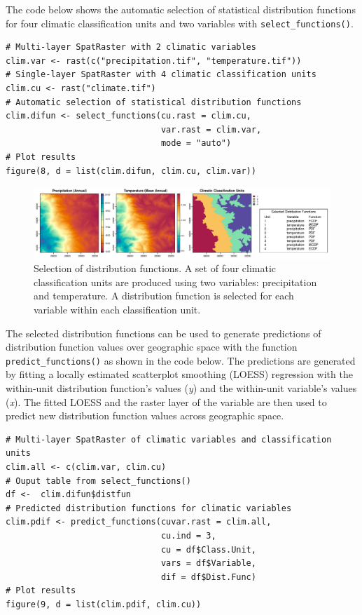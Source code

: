 The code below shows the automatic selection of statistical distribution
functions for four climatic classification units and two variables with
\texttt{select\_functions()}.

\begin{verbatim}
# Multi-layer SpatRaster with 2 climatic variables
clim.var <- rast(c("precipitation.tif", "temperature.tif"))
# Single-layer SpatRaster with 4 climatic classification units
clim.cu <- rast("climate.tif")
# Automatic selection of statistical distribution functions
clim.difun <- select_functions(cu.rast = clim.cu,
                               var.rast = clim.var,
                               mode = "auto")
# Plot results
figure(8, d = list(clim.difun, clim.cu, clim.var))
\end{verbatim}

\begin{figure}[H]

{\centering \includegraphics[width=1\linewidth,height=0.13\textheight]{figures/figure_8} 

}

\caption{Selection of distribution functions. A set of four climatic classification units are produced using two variables: precipitation and temperature. A distribution function is selected for each variable within each classification unit.}\label{fig:f9}
\end{figure}

The selected distribution functions can be used to generate predictions of
distribution function values over geographic space with the function
\texttt{predict\_functions()} as shown in the code below. The predictions are generated
by fitting a locally estimated scatterplot smoothing (LOESS) regression with the
within-unit distribution function's values (\emph{y}) and the within-unit variable's
values (\emph{x}). The fitted LOESS and the raster layer of the variable are then
used to predict new distribution function values across geographic space.

\begin{verbatim}
# Multi-layer SpatRaster of climatic variables and classification units
clim.all <- c(clim.var, clim.cu)
# Ouput table from select_functions()
df <-  clim.difun$distfun
# Predicted distribution functions for climatic variables
clim.pdif <- predict_functions(cuvar.rast = clim.all,
                               cu.ind = 3,
                               cu = df$Class.Unit,
                               vars = df$Variable,
                               dif = df$Dist.Func)
# Plot results
figure(9, d = list(clim.pdif, clim.cu))
\end{verbatim}

